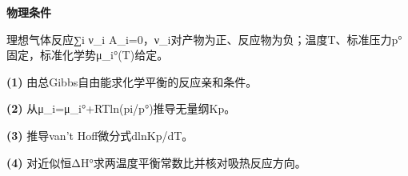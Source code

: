 \textbf{物理条件}\par 理想气体反应∑i ν\_i A\_i=0，ν\_i对产物为正、反应物为负；温度T、标准压力p°固定，标准化学势μ\_i°(T)给定。
\par\noindent\textbf{(1)} 由总Gibbs自由能求化学平衡的反应亲和条件。
\par\noindent\textbf{(2)} 从μ\_i=μ\_i°+RTln(pi/p°)推导无量纲Kp。
\par\noindent\textbf{(3)} 推导van’t Hoff微分式dlnKp/dT。
\par\noindent\textbf{(4)} 对近似恒ΔH°求两温度平衡常数比并核对吸热反应方向。
